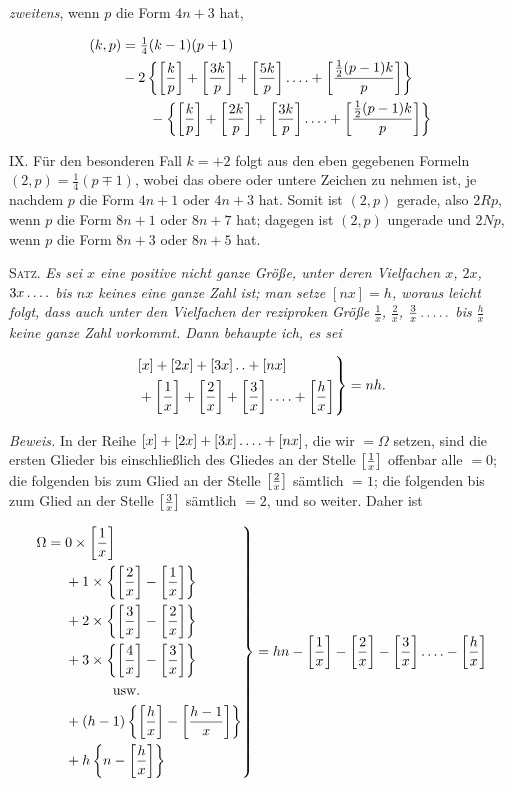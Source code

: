 \emph{zweitens}, wenn $p$ die Form $4n+3$ hat,

\[
\begin{aligned}
(k,p)&=\tfrac14(k-1)(p+1)\\
& -2\left\{\left[\frac{k}{p}\right]+\left[\frac{3k}{p}\right]+\left[\frac{5k}{p}\right]\mathinner{.\,.\,.\,.}+\left[\frac{\frac12(p-1)k}{p}\right]\right\}\\
&\qquad-\left\{\left[\frac{k}{p}\right]+\left[\frac{2k}{p}\right]+\left[\frac{3k}{p}\right]\mathinner{.\,.\,.\,.}+\left[\frac{\frac12(p-1)k}{p}\right]\right\}
\end{aligned}
\]

IX. Für den besonderen Fall $k=+2$ folgt aus den eben gegebenen Formeln $(2,p)=\tfrac14(p\mp1)$, wobei das obere oder untere Zeichen zu nehmen ist, je nachdem $p$ die Form $4n+1$ oder $4n+3$ hat. Somit ist $(2,p)$ gerade, also $2Rp$, wenn $p$ die Form $8n+1$ oder $8n+7$ hat; dagegen ist $(2,p)$ ungerade und $2Np$, wenn $p$ die Form $8n+3$ oder $8n+5$ hat.


\textsc{Satz.} \emph{Es sei $x$ eine positive nicht ganze Größe, unter deren Vielfachen $x$, $2x$,} \emph{$3x\mathinner{.\,.\,.\,.}$ bis $nx$ keines eine ganze Zahl ist; man setze $[nx]=h$, woraus leicht folgt,} \emph{dass auch unter den Vielfachen der reziproken Größe $\frac1x$, $\frac2x$, $\frac3x\mathinner{.\,.\,.\,.\,.}$ bis $\frac hx$ keine ganze Zahl} \emph{vorkommt. Dann behaupte ich, es sei}

\[
\begin{aligned}
\left.\begin{aligned}
&[x]+[2x]+[3x]\mathinner{.\,.}+[nx]\\
&+\left[\frac1x\right]+\left[\frac2x\right]+\left[\frac3x\right]\mathinner{.\,.\,.\,.}+\left[\frac hx\right]
\end{aligned}\right\}=nh.
\end{aligned}
\]

\emph{Beweis.} In der Reihe $[x]+[2x]+[3x]\mathinner{.\,.\,.\,.}+[nx]$, die wir $=\Omega$ setzen, sind die ersten Glieder bis einschließlich des Gliedes an der Stelle $\left[\frac1x\right]$ offenbar alle $=0$; die folgenden bis zum Glied an der Stelle $\left[\frac2x\right]$ sämtlich $=1$; die folgenden bis zum Glied an der Stelle $\left[\frac3x\right]$ sämtlich $=2$, und so weiter. Daher ist

\[
\begin{aligned}
\left.\begin{aligned}
\Omega={}&0\times\gbr{\frac1x}\\
&+1\times\left\{\gbr{\frac2x}-\gbr{\frac1x}\right\}\\
&+2\times\left\{\gbr{\frac3x}-\gbr{\frac2x}\right\}\\
&+3\times\left\{\gbr{\frac4x}-\gbr{\frac3x}\right\}\\
&\hspace{12mm}\text{usw.}\\
&+(h-1)\left\{\gbr{\frac hx}-\gbr{\frac{h-1}{x}}\right\}\\
&+h\left\{n-\gbr{\frac hx}\right\}
\end{aligned}\right\}=hn-\gbr{\frac1x}-\gbr{\frac2x}-\gbr{\frac3x}\dotsfour-\gbr{\frac hx}
\end{aligned}
\]

